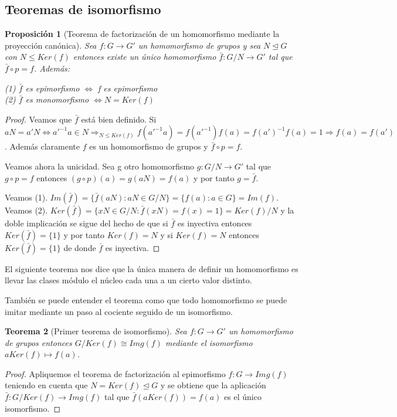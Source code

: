 \documentclass{article}
\theoremstyle{theorem-style}  %
\newtheorem{theorem}{Teorema}[section]  %
\newtheorem{proposition}[theorem]{Proposición}
\theoremstyle{definition-style}
\theoremstyle{example-style}
\begin{document}
\subsection{Teoremas de isomorfismo}

\begin{proposition}[Teorema de factorización de un homomorfismo mediante la proyección canónica]
Sea $f:G \rightarrow G'$ un homomorfismo de grupos y sea $N \trianglelefteq G$ con $N \le Ker(f)$ entonces existe un único homomorfismo $\bar{f}:G/N \rightarrow G'$ tal que $\bar{f} \circ p = f$. Además:

(1) $\bar{f}$ es epimorfismo $\iff$ f es epimorfismo \\
(2) $\bar{f}$ es monomorfismo $\iff N = Ker(f)$
\end{proposition}
\begin{proof}
Veamos que $\bar{f}$ está bien definido. Si $aN = a'N \iff a'^{-1}a \in N \Rightarrow_{N \le Ker(f)} f(a'^{-1}a) = f(a'^{-1})f(a) = f(a')^{-1}f(a) = 1 \Rightarrow f(a) = f(a')$. Además claramente $f$ es un homomorfismo de grupos y $\bar{f} \circ p = f$.

Veamos ahora la unicidad. Sea g otro homomorfismo $g:G/N \rightarrow G'$ tal que $g \circ p = f$ entonces $(g \circ p)(a) = g(aN) = f(a)$ y por tanto $g = \bar{f}$.

Veamos (1). $Im(\bar{f}) = \{\bar{f}(aN):aN \in G/N\} = \{f(a):a \in G\} = Im(f)$. \\
Veamos (2). $Ker(\bar{f}) = \{xN \in G/N :\bar{f}(xN) = f(x) = 1\} =  Ker(f)/N$ y la doble implicación se sigue del hecho de que si $\bar{f}$ es inyectiva entonces $Ker(\bar{f}) = \{1\}$ y por tanto $Ker(f) = N$ y si $Ker(f) = N$ entonces $Ker(\bar{f}) = \{1\}$ de donde $\bar{f}$ es inyectiva.
\end{proof}

El siguiente teorema nos dice que la única manera de definir un homomorfismo es llevar las clases módulo el núcleo cada una a un cierto valor distinto. 

También se puede entender el teorema como que todo homomorfismo se puede imitar mediante un paso al cociente seguido de un isomorfismo. 

\begin{theorem}[Primer teorema de isomorfismo]
Sea $f:G \rightarrow G'$ un homomorfismo de grupos entonces $G/Ker(f) \cong Img(f)$ mediante el isomorfismo $aKer(f) \mapsto f(a)$.
\end{theorem}
\begin{proof}
Apliquemos el teorema de factorización al epimorfismo $f:G \rightarrow Img(f)$ teniendo en cuenta que $N=Ker(f) \trianglelefteq G$ y se obtiene que la aplicación $\bar{f}:G/Ker(f) \rightarrow Img(f)$ tal que $\bar{f}(aKer(f)) = f(a)$ es el único isomorfismo.
\end{proof}
\end{document}
